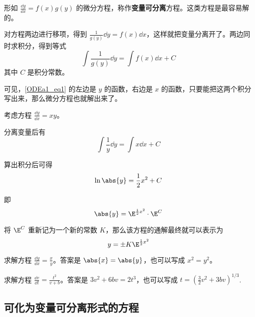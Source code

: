 

形如 $\frac{\dd y}{\dd x}=f(x)g(y)$ 的微分方程，称作\textbf{变量可分离}方程。这类方程是最容易解的。

对方程两边进行移项，得到 $\frac{1}{g(y)}\dd y=f(x)\dd x$，这样就把变量分离开了。两边同时求积分，得到等式
\begin{equation}\label{ODEa1_eq1}
\int\frac{1}{g(y)}\dd y=\int f(x)\dd x+C
\end{equation}
其中 $C$ 是积分常数。

可见，\autoref{ODEa1_eq1} 的左边是 $y$ 的函数，右边是 $x$ 的函数，只要能把这两个积分写出来，那么微分方程也就解出来了。

\begin{example}{}
考虑方程 $\frac{\dd y}{\dd x}=xy$。

分离变量后有
\begin{equation}
\int\frac{1}{y}\dd y=\int x\dd x+C
\end{equation}

算出积分后可得
\begin{equation}
\ln\abs{y}=\frac{1}{2}x^2+C
\end{equation}

即
\begin{equation}
\abs{y}=\E^{\frac{1}{2}x^2}\cdot\E^C
\end{equation}

将 $\E^C$ 重新记为一个新的常数 $K$，那么该方程的通解最终就可以表示为
\begin{equation}
y=\pm K\E^{\frac{1}{2}x^2}
\end{equation}
\end{example}

\begin{exercise}{}
求解方程 $\frac{\dd y}{\dd x}=\frac{x}{y}$。答案是 $\abs{x}=\abs{y}$，也可以写成 $x^2=y^2$。
\end{exercise}

\begin{exercise}{}
求解方程 $\frac{\dd v}{\dd t}=\frac{t^2}{v+b}$。答案是 $3v^2+6bv=2t^3$，也可以写成 $t=(\frac{3}{2}v^2+3bv)^{1/3}$.
\end{exercise}

\subsection{可化为变量可分离形式的方程}

